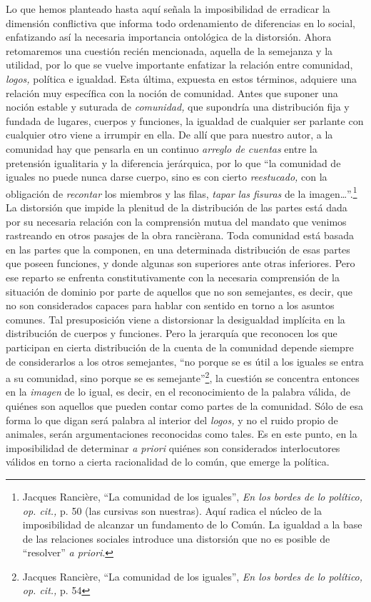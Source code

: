 Lo que hemos planteado hasta aquí señala la imposibilidad de erradicar la dimensión conflictiva que informa todo ordenamiento de diferencias en lo social, enfatizando así la necesaria importancia ontológica de la distorsión. Ahora retomaremos una cuestión recién mencionada, aquella de la semejanza y la utilidad, por lo que se vuelve importante enfatizar la relación entre comunidad, \emph{logos,} política e igualdad. Esta última, expuesta en estos términos, adquiere una relación muy específica con la noción de comunidad. Antes que suponer una noción estable y suturada de \emph{comunidad,} que supondría una distribución fija y fundada de lugares, cuerpos y funciones, la igualdad de cualquier ser parlante con cualquier otro viene a irrumpir en ella. De allí que para nuestro autor, a la comunidad hay que pensarla en un continuo \emph{arreglo de cuentas} entre la pretensión igualitaria y la diferencia jerárquica, por lo que \enquote{la comunidad de iguales no puede nunca darse cuerpo, sino es con cierto \emph{reestucado,} con la obligación de \emph{recontar} los miembros y las filas, \emph{tapar las fisuras} de la imagen\ldots}.\footnote{Jacques Rancière, \enquote{La comunidad de los iguales}, \emph{En los bordes de lo político,} \emph{op. cit.,} p. 50 (las cursivas son nuestras). Aquí radica el núcleo de la imposibilidad de alcanzar un fundamento de lo Común. La igualdad a la base de las relaciones sociales introduce una distorsión que no es posible de \enquote{resolver} \emph{a priori}.}
La distorsión que impide la plenitud de la distribución de las partes está dada por su necesaria relación con la comprensión mutua del mandato que venimos rastreando en otros pasajes de la obra rancièrana. Toda comunidad está basada en las partes que la componen, en una determinada distribución de esas partes que poseen funciones, y donde algunas son superiores ante otras inferiores. Pero ese reparto se enfrenta constitutivamente con la necesaria comprensión de la situación de dominio por parte de aquellos que no son semejantes, es decir, que no son considerados capaces para hablar con sentido en torno a los asuntos comunes. Tal presuposición viene a distorsionar la desigualdad implícita en la distribución de cuerpos y funciones. Pero la jerarquía que reconocen los que participan en cierta distribución de la cuenta de la comunidad depende siempre de considerarlos a los otros semejantes, \enquote{no porque se es útil a los iguales se entra a su comunidad, sino porque se es semejante}\footnote{Jacques Rancière, \enquote{La comunidad de los iguales}, \emph{En los bordes de lo político,} \emph{op. cit.,} p. 54}, la cuestión se concentra entonces en la \emph{imagen} de lo igual, es decir, en el reconocimiento de la palabra válida, de quiénes son aquellos que pueden contar como partes de la comunidad. Sólo de esa forma lo que digan será palabra al interior del \emph{logos,} y no el ruido propio de animales, serán argumentaciones reconocidas como tales. Es en este punto, en la imposibilidad de determinar \emph{a priori} quiénes son considerados interlocutores válidos en torno a cierta racionalidad de lo común, que emerge la política.


